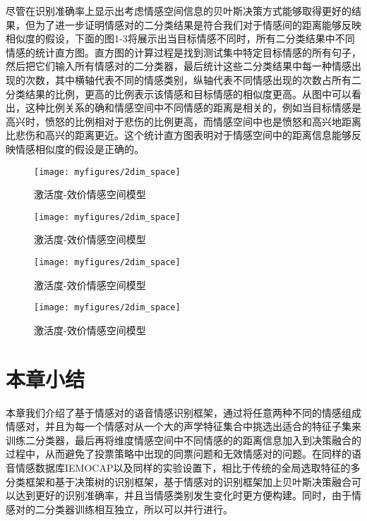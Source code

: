 尽管在识别准确率上显示出考虑情感空间信息的贝叶斯决策方式能够取得更好的结果，但为了进一步证明情感对的二分类结果是符合我们对于情感间的距离能够反映相似度的假设，下面的图1-3将展示出当目标情感不同时，所有二分类结果中不同情感的统计直方图。直方图的计算过程是找到测试集中特定目标情感的所有句子，然后把它们输入所有情感对的二分类器，最后统计这些二分类结果中每一种情感出现的次数，其中横轴代表不同的情感类别，纵轴代表不同情感出现的次数占所有二分类结果的比例，更高的比例表示该情感和目标情感的相似度更高。从图中可以看出，这种比例关系的确和情感空间中不同情感的距离是相关的，例如当目标情感是高兴时，愤怒的比例相对于悲伤的比例更高，而情感空间中也是愤怒和高兴地距离比悲伤和高兴的距离更近。这个统计直方图表明对于情感空间中的距离信息能够反映情感相似度的假设是正确的。

\begin{figure}[H] %
    \centering
    \texttt{[image: myfigures/2dim\_space]}
    \caption{激活度-效价情感空间模型}
    \label{fig:xfig1}
\end{figure}

\begin{figure}[H] %
    \centering
    \texttt{[image: myfigures/2dim\_space]}
    \caption{激活度-效价情感空间模型}
    \label{fig:xfig1}
\end{figure}

\begin{figure}[H] %
    \centering
    \texttt{[image: myfigures/2dim\_space]}
    \caption{激活度-效价情感空间模型}
    \label{fig:xfig1}
\end{figure}

\begin{figure}[H] %
    \centering
    \texttt{[image: myfigures/2dim\_space]}
    \caption{激活度-效价情感空间模型}
    \label{fig:xfig1}
\end{figure}

\section{本章小结}
\label{sec:emo_pair_summary}

本章我们介绍了基于情感对的语音情感识别框架，通过将任意两种不同的情感组成情感对，并且为每一个情感对从一个大的声学特征集合中挑选出适合的特征子集来训练二分类器，最后再将维度情感空间中不同情感的的距离信息加入到决策融合的过程中，从而避免了投票策略中出现的同票问题和无效情感对的问题。在同样的语音情感数据库IEMOCAP以及同样的实验设置下，相比于传统的全局选取特征的多分类框架和基于决策树的识别框架，基于情感对的识别框架加上贝叶斯决策融合可以达到更好的识别准确率，并且当情感类别发生变化时更方便构建。同时，由于情感对的二分类器训练相互独立，所以可以并行进行。
